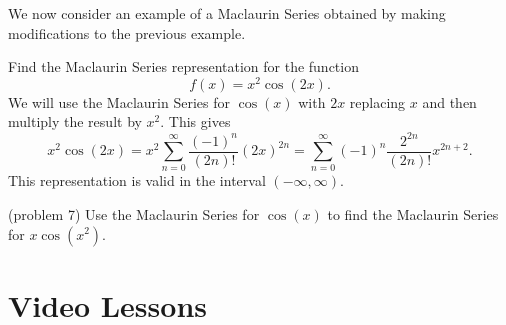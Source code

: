\documentclass{ximera}
\begin{document}
We now consider an example of a Maclaurin Series obtained by making modifications to the previous example.

\begin{example}[example 7]
Find the Maclaurin Series representation for the function 
\[
f(x) = x^2\cos(2x).
\]
We will use the Maclaurin Series for $\cos(x)$ with $2x$ replacing $x$ and then multiply the result by $x^2$.
This gives
\[
x^2\cos(2x) = x^2\sum_{n=0}^\infty \frac{(-1)^n}{(2n)!}(2x)^{2n} = \sum_{n=0}^\infty (-1)^n\frac{2^{2n}}{(2n)!}x^{2n+2}.
\]
This representation is valid in the interval $(-\infty, \infty)$.
\end{example}



\begin{problem}(problem 7)
Use the Maclaurin Series for $\cos(x)$ to find the Maclaurin Series for $x \cos(x^2)$.
\begin{multipleChoice}
\end{multipleChoice}
\end{problem}


\section{Video Lessons}


\begin{center}
\begin{foldable}
\end{foldable}
\end{center}
\end{document}
